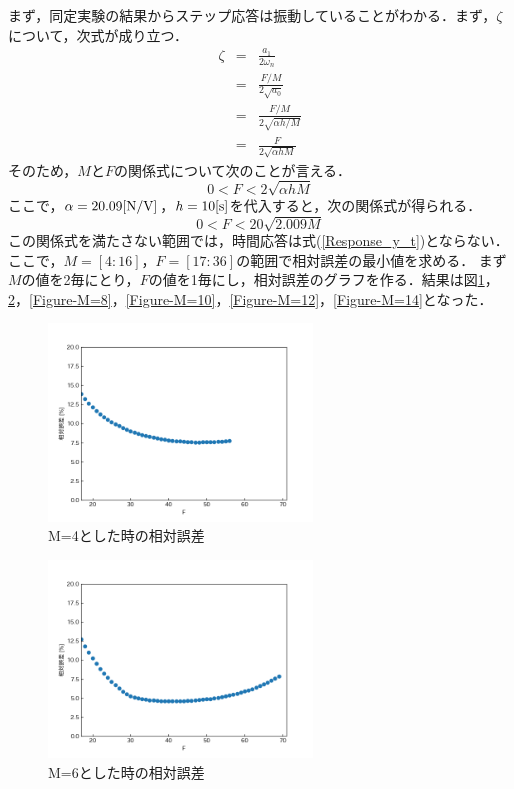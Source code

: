 \documentclass[12pt]{jsarticle}
\begin{document}
まず，同定実験の結果からステップ応答は振動していることがわかる．まず，$\zeta$について，次式が成り立つ．
\begin{eqnarray}
  \label{MF_zeta}
  \zeta &=& \frac{a_1}{2\omega_n} \nonumber \\
        &=& \frac{F/M}{2\sqrt{a_0}} \nonumber \\
        &=& \frac{F/M}{2\sqrt{\alpha h / M}} \nonumber \\
        &=& \frac{F}{2\sqrt{\alpha h M}}
\end{eqnarray}
そのため，$M$と$F$の関係式について次のことが言える．
\begin{equation}
  \label{MF_F_greater}
  0 < F < 2\sqrt{\alpha h M}
\end{equation}
ここで，$\alpha = 20.09{\rm [N/V]}$，$h = 10{\rm [s]}$を代入すると，次の関係式が得られる．
\begin{equation}
  \label{MF_F_greater_changed}
  0 < F < 20\sqrt{2.009 M}
\end{equation}
この関係式を満たさない範囲では，時間応答は式(\ref{Response_y_t})とならない．
ここで，$M=[4:16]$，$F=[17:36]$の範囲で相対誤差の最小値を求める．
まず$M$の値を2毎にとり，$F$の値を1毎にし，相対誤差のグラフを作る．結果は図\ref{Figure-M=4}，\ref{Figure-M=6}，\ref{Figure-M=8}，\ref{Figure-M=10}，\ref{Figure-M=12}，\ref{Figure-M=14}となった．
\begin{figure}[H]
  \begin{center}
    \includegraphics[clip,width=7.0cm]{../img/M-4.png}
    \caption{M=4とした時の相対誤差}
    \label{Figure-M=4}
  \end{center}
\end{figure}
\begin{figure}[H]
  \begin{center}
    \includegraphics[clip,width=7.0cm]{../img/M-6.png}
    \caption{M=6とした時の相対誤差}
    \label{Figure-M=6}
  \end{center}
\end{figure}
\end{document}
